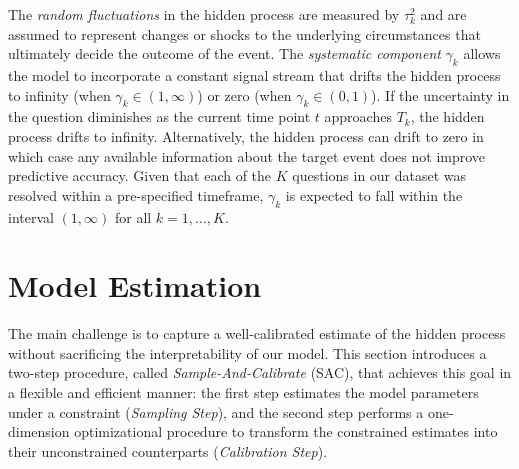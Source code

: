 \documentclass[aoas, preprint]{imsart}
\numberwithin{equation}{section}
\theoremstyle{plain}
\begin{document}
 The \textit{random fluctuations} in the hidden process are measured by $\tau^2_k$ and are assumed to represent changes or shocks to the underlying circumstances that ultimately decide the outcome of the event. The \textit{systematic component} $\gamma_k$ allows the model to incorporate a constant signal stream that drifts the hidden process to infinity (when $\gamma_k \in (1, \infty)$) or zero (when $\gamma_k \in (0, 1)$). If the uncertainty in the question diminishes as the current time point $t$ approaches $T_k$, the hidden process drifts to infinity. Alternatively, the hidden process can drift to zero in which case any available information about the target event does not improve predictive accuracy. Given that each of the $K$ questions in our dataset was resolved within a pre-specified timeframe, $\gamma_k$ is expected to fall within the interval $(1, \infty)$ for all $k = 1, \dots, K$. 
 

\section{Model Estimation}
\label{identifiability}


The main challenge is to capture a well-calibrated estimate of the hidden process without sacrificing the interpretability of our model. This section introduces a two-step procedure, called \textit{Sample-And-Calibrate} (SAC), that achieves this goal in a flexible and efficient manner: the first step estimates the model parameters under a constraint (\textit{Sampling Step}), and the second step performs a one-dimension optimizational procedure to transform the constrained estimates into their unconstrained counterparts (\textit{Calibration Step}). 
\end{document}
